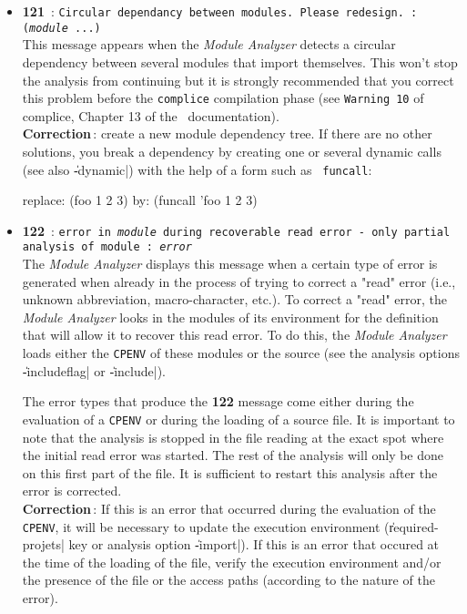 \begin{itemize}
\item {\Large {\bf 121}}\ : {\tt Circular dependancy between modules. Please
redesign. : ({\em module} ...)}\\
This message appears when the {\em Module Analyzer} detects a circular dependency between several modules that import themselves.  This won't stop the analysis from continuing but it is strongly recommended that you correct this problem before the {\tt complice} compilation phase (see {\tt Warning 10} of complice, Chapter 13 of the \LeLisp\ documentation).\\ 
{\bf Correction}\,: create a new module dependency tree.
If there are no other solutions, you break a dependency by creating one or several dynamic calls (see also \|-dynamic|) with the help of a form such as {\tt
funcall}:

\begin{Longcode*}
replace:  (foo 1 2 3)
by: (funcall 'foo 1 2 3)
\end{Longcode*}

\item {\Large {\bf 122}}\ : {\tt error in {\em module} during recoverable read
error - only partial analysis of module : {\em error}}\\
The {\em Module Analyzer} displays this message when a certain type of error is generated when already in the process of trying to correct a "read" error (i.e., unknown abbreviation, macro-character, etc.).  To correct a "read" error, the {\em Module Analyzer} looks in the modules of its environment for the definition that will allow it to recover this read error.  To do this, the {\em Module Analyzer} loads either the {\tt CPENV} of these modules or the source (see the analysis options \|-includeflag| or \|-include|).

The error types that produce the {\bf 122} message come either during the evaluation of a {\tt CPENV} or during the loading of a source file.  It is important to note that the analysis is stopped in the file reading at the exact spot where the initial read error was started.  The rest of the analysis will only be done on this first part of the file.  It is sufficient to restart this analysis after the error is corrected.\\
{\bf Correction}\,: If this is an error that occurred during the evaluation of the {\tt CPENV}, it will be necessary to update the execution environment (\|required-projets| key or analysis option \|-import|).  If this is an error that occured at the time of the loading of the file, verify the execution environment and/or the presence of the file or the access paths (according to the nature of the error).  


\end{itemize}
